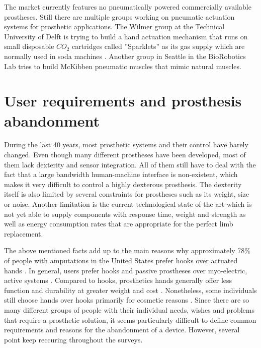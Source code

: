 \documentclass[main]{subfiles}
\begin{document}
The market currently features no pneumatically powered commercially available prostheses. Still there are multiple groups working on pneumatic actuation systems for prosthetic applications. The Wilmer group at the Technical University of Delft is trying to build a hand actuation mechanism that runs on small disposable $CO_2$ cartridges called ''Sparklets'' as its gas supply which are normally used in soda machines \cite{Plettenburg2002}. Another group in Seattle in the BioRobotics Lab tries to build McKibben pneumatic muscles that mimic natural muscles.

\section{User requirements and prosthesis abandonment}
\label{abandonment}

During the last 40 years, most prosthetic systems and their control have barely changed. Even though many different prostheses have been developed, most of them lack dexterity and sensor integration. All of them still have to deal with the fact that a large bandwidth human-machine interface is non-existent, which makes it very difficult to control a highly dexterous prosthesis. The dexterity itself is also limited by several constraints for prostheses such as its weight, size or noise. Another limitation is the current technological state of the art which is not yet able to supply components with response time, weight and strength as well as energy consumption rates that are appropriate for the perfect limb replacement.

The above mentioned facts add up to the main reasons why approximately 78\% of people with amputations in the United States prefer hooks over actuated hands \cite{LeBlanc1998}. In general, users prefer hooks and passive prostheses over myo-electric, active systems \cite{LeBlanc1998}. Compared to hooks, prosthetics hands generally offer less function and durability at greater weight and cost \cite{abandonment1}. Nonetheless, some individuals still choose hands over hooks primarily for cosmetic reasons \cite{Newman2008}. Since there are so many different groups of people with their individual needs, wishes and problems that require a prosthetic solution, it seems particularly difficult to define common requirements and reasons for the abandonment of a device. However, several point keep reccuring throughout the surveys.
\end{document}
